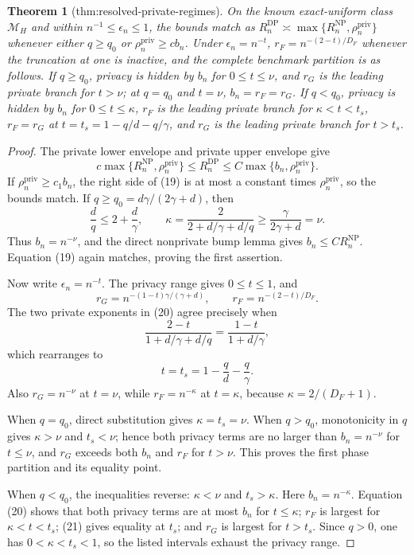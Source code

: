 \documentclass{article}
\newtheorem{theorem}{Theorem}
\begin{document}
\begin{theorem}[thm:resolved-private-regimes]\label{thm:resolved-private-regimes}
On the known exact-uniform class \(\mathcal M_H\) and within \(n^{-1}\le\epsilon_n\le1\), the bounds match as \(R_n^{\mathrm{DP}}\asymp\max\{R_n^{\mathrm{NP}},\rho_n^{\mathrm{priv}}\}\) whenever either \(q\ge q_0\) or \(\rho_n^{\mathrm{priv}}\ge c b_n\). Under \(\epsilon_n=n^{-t}\), \(r_F=n^{-(2-t)/D_F}\) whenever the truncation at one is inactive, and the complete benchmark partition is as follows. If \(q\ge q_0\), privacy is hidden by \(b_n\) for \(0\le t\le\nu\), and \(r_G\) is the leading private branch for \(t>\nu\); at \(q=q_0\) and \(t=\nu\), \(b_n=r_F=r_G\). If \(q<q_0\), privacy is hidden by \(b_n\) for \(0\le t\le\kappa\), \(r_F\) is the leading private branch for \(\kappa<t<t_s\), \(r_F=r_G\) at \(t=t_s=1-q/d-q/\gamma\), and \(r_G\) is the leading private branch for \(t>t_s\).
\end{theorem}
\begin{proof}
The private lower envelope and private upper envelope give
\[
 c\max\{R_n^{\mathrm{NP}},\rho_n^{\mathrm{priv}}\}
 \le R_n^{\mathrm{DP}}
 \le C\max\{b_n,\rho_n^{\mathrm{priv}}\}.                 \tag{19}
\]
If \(\rho_n^{\mathrm{priv}}\ge c_1b_n\), the right side of (19) is at most a constant times \(\rho_n^{\mathrm{priv}}\), so the bounds match.  If \(q\ge q_0=d\gamma/(2\gamma+d)\), then
\[
 \frac{d}{q}\le2+\frac d\gamma,
 \qquad
 \kappa=\frac{2}{2+d/\gamma+d/q}\ge\frac{\gamma}{2\gamma+d}=\nu.
\]
Thus \(b_n=n^{-\nu}\), and the direct nonprivate bump lemma gives \(b_n\le C R_n^{\mathrm{NP}}\).  Equation (19) again matches, proving the first assertion.

Now write \(\epsilon_n=n^{-t}\).  The privacy range gives \(0\le t\le1\), and
\[
 r_G=n^{-(1-t)\gamma/(\gamma+d)},
 \qquad r_F=n^{-(2-t)/D_F}.                              \tag{20}
\]
The two private exponents in (20) agree precisely when
\[
 \frac{2-t}{1+d/\gamma+d/q}
 =\frac{1-t}{1+d/\gamma},
\]
which rearranges to
\[
 t=t_s=1-\frac qd-\frac q\gamma.                         \tag{21}
\]
Also \(r_G=n^{-\nu}\) at \(t=\nu\), while \(r_F=n^{-\kappa}\) at \(t=\kappa\), because \(\kappa=2/(D_F+1)\).

When \(q=q_0\), direct substitution gives \(\kappa=t_s=\nu\).  When \(q>q_0\), monotonicity in \(q\) gives \(\kappa>\nu\) and \(t_s<\nu\); hence both privacy terms are no larger than \(b_n=n^{-\nu}\) for \(t\le\nu\), and \(r_G\) exceeds both \(b_n\) and \(r_F\) for \(t>\nu\).  This proves the first phase partition and its equality point.

When \(q<q_0\), the inequalities reverse: \(\kappa<\nu\) and \(t_s>\kappa\).  Here \(b_n=n^{-\kappa}\).  Equation (20) shows that both privacy terms are at most \(b_n\) for \(t\le\kappa\); \(r_F\) is largest for \(\kappa<t<t_s\); (21) gives equality at \(t_s\); and \(r_G\) is largest for \(t>t_s\).  Since \(q>0\), one has \(0<\kappa<t_s<1\), so the listed intervals exhaust the privacy range.
\end{proof}
\end{document}
